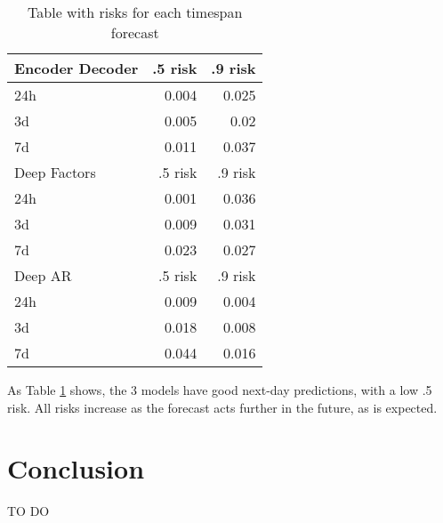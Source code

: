 \documentclass[a4paper]{article}
\begin{document}
\begin{center}
\begin{table}[H]
\caption{\label{tab:orgf7c5e45}
Table with risks for each timespan forecast}
\centering
\begin{tabular}{lrr}
\hline
Encoder Decoder & .5 risk & .9 risk\\
\hline
24h & 0.004 & 0.025\\
3d & 0.005 & 0.02\\
7d & 0.011 & 0.037\\
\hline
Deep Factors & .5 risk & .9 risk\\
\hline
24h & 0.001 & 0.036\\
3d & 0.009 & 0.031\\
7d & 0.023 & 0.027\\
\hline
Deep AR & .5 risk & .9 risk\\
\hline
24h & 0.009 & 0.004\\
3d & 0.018 & 0.008\\
7d & 0.044 & 0.016\\
\hline
\end{tabular}
\end{table}
\end{center}


As Table \ref{tab:orgf7c5e45} shows, the 3 models have good next-day predictions, with a low .5 risk. All risks increase as the forecast acts further in the future, as is expected.



\section{Conclusion}
\label{sec:org1323f05}

TO DO


{}
\end{document}
